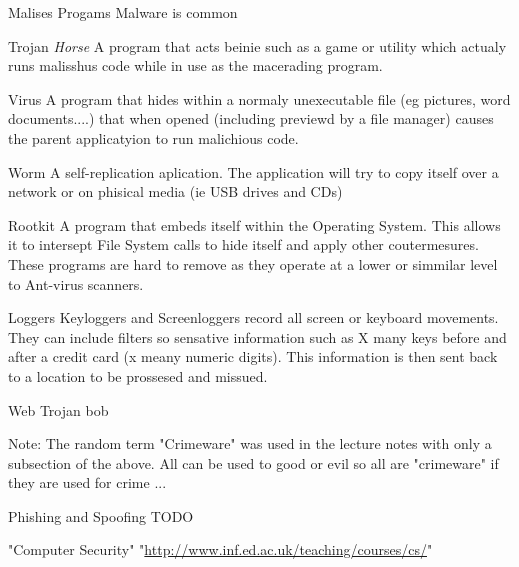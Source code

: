 \documentclass[11pt,twoside,a4paper]{article}
\begin{document}
  \clearpage
  
  \begin{section}{Malises Progams}
    Malware is common
      
      \begin{subsection}{Trojan \emph{Horse}}
        A program that acts beinie such as a game or utility which actualy runs malisshus code while in use as the macerading program.
      \end{subsection}
      
      \begin{subsection}{Virus}
        A program that hides within a normaly unexecutable file (eg pictures, word documents....) that when opened (including previewd by a file manager) causes the parent applicatyion to run malichious code.
      \end{subsection}
      
      \begin{subsection}{Worm}
        A self-replication aplication. The application will try to copy itself over a network or on phisical media (ie USB drives and CDs)
      \end{subsection}
      
      \begin{subsection}{Rootkit}
        A program that embeds itself within the Operating System. This allows it to intersept File System calls to hide itself and apply other coutermesures. These programs are hard to remove as they operate at a lower or simmilar level to Ant-virus scanners.
      \end{subsection}
      
      \begin{subsection}{Loggers}
        Keyloggers and Screenloggers record all screen or keyboard movements. They can include filters so sensative information such as X many keys before and after a credit card (x meany numeric digits). This information is then sent back to a location to be prossesed and missued.
      \end{subsection}
      
      \begin{subsection}{Web Trojan}
        bob
      \end{subsection}
      
      Note: The random term "Crimeware" was used in the lecture notes with only a subsection of the above. All can be used to good or evil so all are "crimeware" if they are used for crime ...
  
  \end{section}
  
  \clearpage
  
  \begin{section}{Phishing and Spoofing}
    TODO
  \end{section}
  
  \clearpage  
  
  \begin{thebibliography}{9}
      "Computer Security" "\url{http://www.inf.ed.ac.uk/teaching/courses/cs/}"
  \end{thebibliography}
\end{document}

